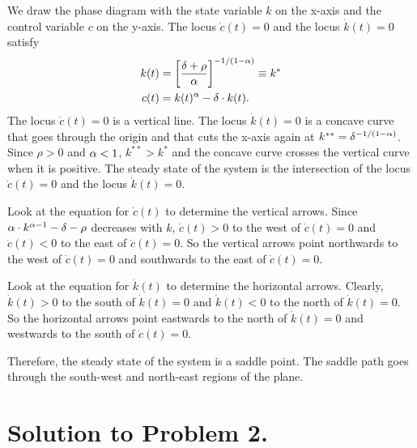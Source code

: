 \documentclass[letterpaper,12pt,leqno]{article}
\begin{document}
\begin{enumerate}
We draw the phase diagram with the state variable $k$ on the x-axis
and the control variable $c$ on the y-axis. The locus $\dot{c}(t)=0$ and the locus $\dot{k}(t)=0$ satisfy
\begin{align*}
k(t)&=\left[\frac{\delta +\rho}{\alpha}\right]^{-1/(1-\alpha)}\equiv k^{*}\\
c(t)&=k(t)^{\alpha}-\delta\cdot k(t).
\end{align*}
The locus  $\dot{c}(t)=0$ is a vertical line. The locus $\dot{k}(t)=0$ is a concave curve that goes through the origin and that cuts the x-axis again at $k^{**}=\delta^{-1/(1-\alpha)}$. Since $\rho>0$ and $\alpha<1$, $k^{**}>k^{*}$ and the concave curve crosses the vertical curve when it is positive. The steady state of the system is the intersection of the locus  $\dot{c}(t)=0$  and the locus $\dot{k}(t)=0$.

Look at the equation for $\dot{c}(t)$ to determine the vertical arrows. Since $\alpha\cdot k^{\alpha-1}-\delta -\rho$ decreases with $k$, $\dot{c}(t)>0$ to the west of $\dot{c}(t)=0$  and $\dot{c}(t)<0$  to the east of $\dot{c}(t)=0$. So the vertical arrows point northwards to the west of $\dot{c}(t)=0$ and southwards to the east of $\dot{c}(t)=0$. 

Look at the equation for $\dot{k}(t)$ to determine the horizontal arrows. Clearly, $\dot{k}(t)>0$ to the south of $\dot{k}(t)=0$ and $\dot{k}(t)<0$ to the north of $\dot{k}(t)=0$. So the horizontal arrows point eastwards to the north of $\dot{k}(t)=0$ and westwards to the south of $\dot{c}(t)=0$. 

Therefore, the steady state of the system is a saddle point. The saddle path goes through the south-west and north-east regions of the plane. 

\end{enumerate}


\section*{Solution to Problem 2.} 
\end{document}
